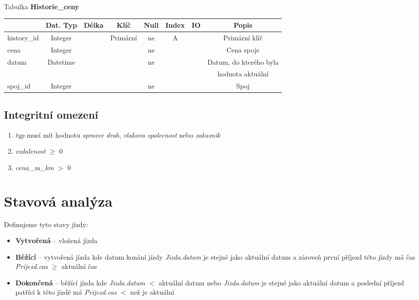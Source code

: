 \documentclass[11pt]{article}
\begin{document}
\noindent
Tabulka \textbf{Historie\_ceny}

\begin{table}[H]
    \begin{tabular}{|l|c|c|c|c|c|c|c|} \hline
                    & Dat. Typ  & Délka & Klíč      & Null  & Index & IO    & Popis \\ \hline
        history\_id	& Integer	&	    & Primární	& ne	& A		&       & Primární klíč \\ \hline
        cena	    & Integer	&	    & 	        & ne	&		&       & Cena spoje \\ \hline
        datum	    & Datetime	&	    & 	        & ne	&		&       & Datum, do kterého byla\\ &&&&&&& hodnota aktuální \\ \hline
        spoj\_id	& Integer	&	    & 	        & ne	&		&       & Spoj \\ \hline
    \end{tabular}
\end{table}

\subsection{Integritní omezení}
\begin{enumerate}
    \item \textit{typ} musí mít hodnotu \textit{spravce drah}, \textit{vlakova spolecnost} nebo \textit{zakaznik}
    \item \textit{vzdalenost} $\geq$ 0
    \item \textit{cena\_za\_km} $>$ 0
\end{enumerate}

\section{Stavová analýza}
Definujeme tyto stavy jízdy:
\begin{itemize}
    \item \textbf{Vytvořená} – vložená jízda
    \item \textbf{Běžící} – vytvořená jízda kde datum konání jízdy \textit{Jizda.datum} je stejné jako aktuální datum a zároveň první příjezd této jízdy má čas \textit{Prijezd.cas} $\geq$ aktuální čas
    \item \textbf{Dokončená} – běžící jízda kde \textit{Jizda.datum} $<$ aktuální datum nebo \textit{Jizda.datum} je stejné jako aktuální datum a poslední příjezd patřící k této jízdě má \textit{Prijezd.cas} $<$ než je aktuální
\end{itemize}
\end{document}
